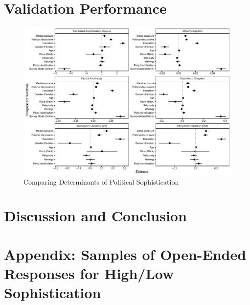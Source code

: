 \documentclass[12pt]{article}
\begin{document}
\section{Validation Performance}

\begin{figure}
\includegraphics[width=\textwidth]{../fig/models.pdf}
\caption{Comparing Determinants of Political Sophistication}
\end{figure}


\section{Discussion and Conclusion}


\clearpage\singlespacing\footnotesize



\clearpage
\section*{Appendix: Samples of Open-Ended Responses for High/Low Sophistication}
\end{document}
